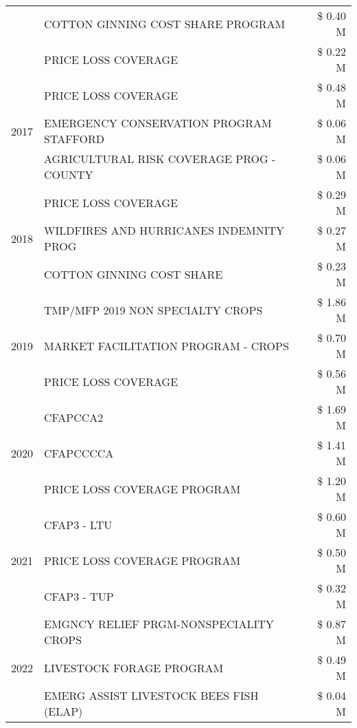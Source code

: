 \begin{tabular}{llr}
 & COTTON GINNING COST SHARE PROGRAM & \$ 0.40 M \\
 & PRICE LOSS COVERAGE & \$ 0.22 M \\
\cline{1-3}
\multirow[t]{3}{*}{2017} & PRICE LOSS COVERAGE & \$ 0.48 M \\
 & EMERGENCY CONSERVATION PROGRAM STAFFORD & \$ 0.06 M \\
 & AGRICULTURAL RISK COVERAGE PROG - COUNTY & \$ 0.06 M \\
\cline{1-3}
\multirow[t]{3}{*}{2018} & PRICE LOSS COVERAGE & \$ 0.29 M \\
 & WILDFIRES AND HURRICANES INDEMNITY PROG & \$ 0.27 M \\
 & COTTON GINNING COST SHARE & \$ 0.23 M \\
\cline{1-3}
\multirow[t]{3}{*}{2019} & TMP/MFP 2019 NON SPECIALTY CROPS & \$ 1.86 M \\
 & MARKET FACILITATION PROGRAM - CROPS & \$ 0.70 M \\
 & PRICE LOSS COVERAGE & \$ 0.56 M \\
\cline{1-3}
\multirow[t]{3}{*}{2020} & CFAPCCA2 & \$ 1.69 M \\
 & CFAPCCCCA & \$ 1.41 M \\
 & PRICE LOSS COVERAGE PROGRAM & \$ 1.20 M \\
\cline{1-3}
\multirow[t]{3}{*}{2021} & CFAP3 - LTU & \$ 0.60 M \\
 & PRICE LOSS COVERAGE PROGRAM & \$ 0.50 M \\
 & CFAP3 - TUP & \$ 0.32 M \\
\cline{1-3}
\multirow[t]{3}{*}{2022} & EMGNCY RELIEF PRGM-NONSPECIALITY CROPS & \$ 0.87 M \\
 & LIVESTOCK FORAGE PROGRAM & \$ 0.49 M \\
 & EMERG ASSIST LIVESTOCK BEES FISH (ELAP) & \$ 0.04 M \\
\cline{1-3}
\bottomrule
\end{tabular}
